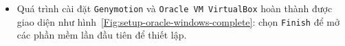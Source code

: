 \documentclass[13pt,a4paper]{extreport}
\begin{document}
\begin{itemize}
\begin{itemize}
					\item Quá trình cài đặt \verb|Genymotion| và \verb|Oracle VM VirtualBox| hoàn thành được giao diện như hình~\ref{Fig:setup-oracle-windows-complete}: chọn \verb|Finish| để mở các phần mềm lần đầu tiên để thiết lập.
						\begin{figure}[!h]
							\vspace{-1cm}
							\begin{center}	
								\hspace{.5cm}
								\\

\end{center}
\end{figure}
\end{itemize}
\end{itemize}
\end{document}
